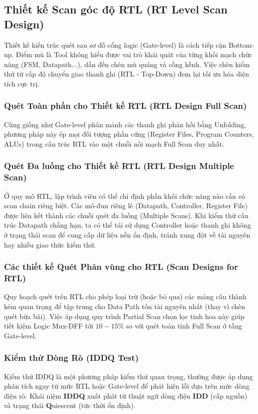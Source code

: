 \subsection{Thiết kế Scan góc độ RTL (RT Level Scan Design)}
Thiết kế kiến trúc quét sau sơ đồ cổng logic (Gate-level) là cách tiếp cận Bottom-up. Điểm mù là Tool không hiểu được vai trò khái quát của từng khối mạch chức năng (FSM, Datapath...), dẫn đến chèn mù quáng và cồng kềnh. Việc chèn kiểm thử từ cấp độ chuyển giao thanh ghi (RTL - Top-Down) đem lại tối ưu hóa diện tích cực trị.

\subsubsection{Quét Toàn phần cho Thiết kế RTL (RTL Design Full Scan)}
Cũng giống như Gate-level phân mảnh các thanh ghi phản hồi bằng Unfolding, phương pháp này ép mọi đối tượng phần cứng (Register Files, Program Counters, ALUs) trong cấu trúc RTL vào một chuỗi nối mạch Full Scan duy nhất.

\subsubsection{Quét Đa luồng cho Thiết kế RTL (RTL Design Multiple Scan)}
Ở quy mô RTL, lập trình viên có thể chỉ định phần khối chức năng nào cần có scan chain riêng biệt. Các mô-đun riêng lẻ (Datapath, Controller, Register File) được liên kết thành các chuỗi quét đa luồng (Multiple Scans). Khi kiểm thử cấu trúc Datapath chẳng hạn, ta có thể tái sử dụng Controller hoặc thanh ghi không ở trạng thái scan để cung cấp dữ liệu nền ổn định, tránh xung đột về tài nguyên hay nhiễu giao thức kiểm thử. 

\subsubsection{Các thiết kế Quét Phân vùng cho RTL (Scan Designs for RTL)}
Quy hoạch quét trên RTL cho phép loại trừ (hoặc bỏ qua) các mảng cấu thành kém quan trọng để tập trung cho Data Path tốn tài nguyên nhất (thay vì chèn quét bừa bãi). Việc áp dụng quy trình Partial Scan chọn lọc tinh hoa này giúp tiết kiệm Logic Mux-DFF tới $10-15\%$ so với quét toán tính Full Scan ở tầng Gate-level.

\subsubsection{Kiểm thử Dòng Rò (IDDQ Test)}
Kiểm thử IDDQ là một phương pháp kiểm thử quan trọng, thường được áp dụng phân tích ngay từ mức RTL hoặc Gate-level để phát hiện lỗi dựa trên mức dòng điện rò. Khái niệm \textbf{IDDQ} xuất phát từ thuật ngữ dòng điện \textbf{IDD} (cấp nguồn) và trạng thái \textbf{Q}uiescent (tức thời ổn định).

